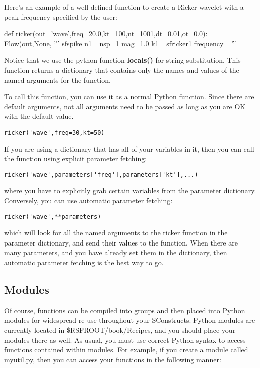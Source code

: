 Here's an example of a well-defined function to create a Ricker wavelet with a peak frequency specified by the user:

\begin{verbatimtab}[4]
def ricker(out='wave',freq=20.0,kt=100,nt=1001,dt=0.01,ot=0.0):
	Flow(out,None,
		'''
		sfspike n1=%
        nsp=1 mag=1.0 k1=%
		sfricker1 frequency=%
		''' %
\end{verbatimtab}

Notice that we use the python function \textbf{locals()} for string substitution.  This function returns a dictionary that contains only the names and values of the named arguments for the function.  

To call this function, you can use it as a normal Python function.  Since there are default arguments, not all arguments need to be passed as long as you are OK with the default value.  

\begin{verbatim}
ricker('wave',freq=30,kt=50)
\end{verbatim}

If you are using a dictionary that has all of your variables in it, then you can call the function using explicit parameter fetching:

\begin{verbatim}
ricker('wave',parameters['freq'],parameters['kt'],...)
\end{verbatim}

where you have to explicitly grab certain variables from the parameter dictionary.  Conversely, you can use automatic parameter fetching: 

\begin{verbatim}
ricker('wave',**parameters)
\end{verbatim}

which will look for all the named arguments to the ricker function in the parameter dictionary, and send their values to the function.  When there are many parameters, and you have already set them in the dictionary, then automatic parameter fetching is the best way to go.

\subsection{Modules}
Of course, functions can be compiled into groups and then placed into Python modules for widespread re-use throughout your SConstructs.  Python modules are currently located in \$RSFROOT/book/Recipes, and you should place your modules there as well.  As usual, you must use correct Python syntax to access functions contained within modules.  For example, if you create a module called myutil.py, then you can access your functions in the following manner:


